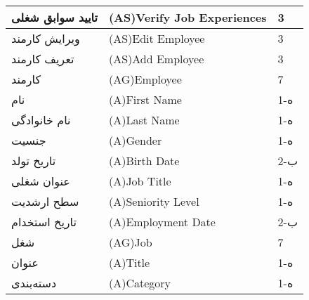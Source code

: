 \documentclass[12pt]{article}
\begin{document}
\begin{longtable}{|l|l|l|}
		\hline
		تایید سوابق شغلی & (AS)Verify Job Experiences & 3     \\
		\hline
		ویرایش کارمند & (AS)Edit Employee & 3     \\
		\hline
		تعریف کارمند & (AS)Add Employee & 3     \\
		\hline
		کارمند & (AG)Employee & 7     \\
		\hline
		نام & (A)First Name & 1-ه   \\
		\hline
		نام خانوادگی & (A)Last Name & 1-ه   \\
		\hline
		جنسیت & (A)Gender & 1-ه   \\
		\hline
		تاریخ تولد & (A)Birth Date & 2-ب   \\
		\hline
		عنوان شغلی & (A)Job Title & 1-ه   \\
		\hline
		سطح ارشدیت & (A)Seniority Level & 1-ه   \\
		\hline
		تاریخ استخدام & (A)Employment Date & 2-ب   \\
		\hline
		شغل & (AG)Job & 7     \\
		\hline
		عنوان & (A)Title & 1-ه   \\
		\hline
		دسته‌بندی & (A)Category & 1-ه   \\
		\hline
	\end{longtable}
	
\end{document}
